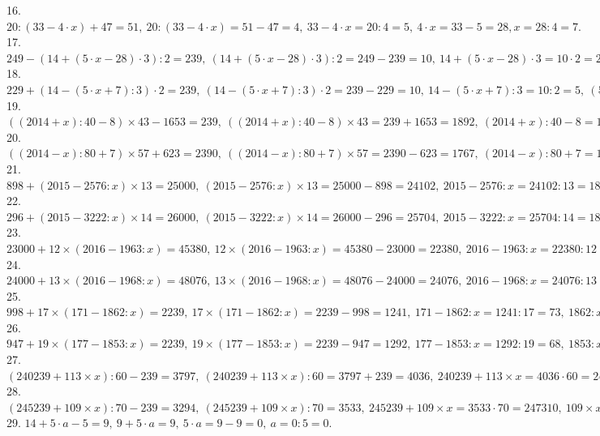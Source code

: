 \documentclass[12pt]{article}
\begin{document}
16. $20:(33-4\cdot x)+47=51,\ 20:(33-4\cdot x)=51-47=4,\ 33-4\cdot x=20:4=5,\ 4\cdot x=33-5=28, x=28:4=7.$\\
17. $249-(14+(5\cdot x-28)\cdot 3):2=239,\ (14+(5\cdot x-28)\cdot 3):2=249-239=10,\ 14+(5\cdot x-28)\cdot 3=10\cdot2=20,\ (5\cdot x-28)\cdot 3=20-14=6,\
5\cdot x-28=6:3=2,\ 5\cdot x=2+28=30,\ x=30:5=6.$\\
18. $229+(14-(5\cdot x+7):3)\cdot2=239,\ (14-(5\cdot x+7):3)\cdot2=239-229=10,\ 14-(5\cdot x+7):3=10:2=5,\ (5\cdot x+7):3=14-5=9,\ 5\cdot x+7=9\cdot3=27,\
5\cdot x=27-7=20,\ x=20:5=4.$\\
19. $((2014+x):40-8)\times43-1653=239,\ ((2014+x):40-8)\times43=239+1653=1892,\ (2014+x):40-8=1892:43=44,\ (2014+x):40=44+8=52,\ 2014+x=52\cdot 40=2080,\
x=2080-2014=66.$\\
20. $((2014-x):80+7)\times57+623=2390,\ ((2014-x):80+7)\times57=2390-623=1767,\ (2014-x):80+7=1767:57=31,\ (2014-x):80=31-7=24,\ 2014-x=24\cdot80=1920, x=2014-1920=94.$\\
21. $898+(2015-2576:x)\times 13=25000,\ (2015-2576:x)\times 13=25000-898=24102,\ 2015-2576:x=24102:13=1854,\ 2576:x=2015-1854=161,\ x=2576:161=16.$\\
22. $296+(2015-3222:x)\times 14=26000,\ (2015-3222:x)\times 14=26000-296=25704,\ 2015-3222:x=25704:14=1836,\ 3222:x=2015-1836-179,\ x=3222:179=18.$\\
23. $23000+12\times (2016-1963:x)=45380,\ 12\times (2016-1963:x)=45380-23000=22380,\ 2016-1963:x=22380:12=1865,\ 1963:x=2016-1865=151,\ x=1963:151=13.$\\
24. $24000+13\times(2016-1968:x)=48076,\ 13\times(2016-1968:x)=48076-24000=24076,\ 2016-1968:x=24076:13=1852,\ 1968:x=2016-1852=164,\ x=1968:164=12.$\\
25. $998+17\times(171-1862:x)=2239,\ 17\times(171-1862:x)=2239-998=1241,\ 171-1862:x=1241:17=73,\ 1862:x=171-73=98,\ x=1862:98=19.$\\
26. $947+19\times(177-1853:x)=2239,\ 19\times(177-1853:x)=2239-947=1292,\ 177-1853:x=1292:19=68,\ 1853:x=177-68=109,\ x=1853:109=17.$\\
27. $(240239+113\times x):60-239=3797,\ (240239+113\times x):60=3797+239=4036,\ 240239+113\times x=4036\cdot60=242160,\ 113\times x=242160-240239=1921,\ x=1921:113=17.$\\
28. $(245239+109\times x):70-239=3294,\ (245239+109\times x):70=3533,\ 245239+109\times x=3533\cdot70=247310,\ 109\times x=2071,\ x=2071:109=19.$\\
29. $14+5\cdot a-5=9,\ 9+5\cdot a=9,\ 5\cdot a=9-9=0,\ a=0:5=0.$\\
\end{document}
